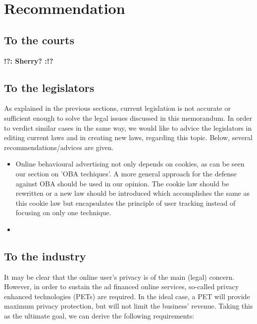 \documentclass[11pt]{article}
\newcommand{\tocheck}[1]{{\bf !?: #1 :!?}}
\begin{document}
\section{Recommendation}
\subsection{To the courts}
\tocheck{Sherry?}
\subsection{To the legislators}
As explained in the previous sections, current legislation is not accurate or sufficient enough to solve the legal issues discussed in this memorandum. In order to verdict similar cases in the same way, we would like to advice the legislators in editing current laws and in creating new laws, regarding this topic. Below, several recommendations/advices are given.


\begin{itemize}
	\item Online behavioural advertising not only depends on cookies, as can be seen our section on 'OBA techiques'. A more general approach for the defense against OBA should be used in our opinion. The cookie law \cite{cookie dinges cite wheet ik veel hoe die heet?} should be rewritten or a new law should be introduced which accomplishes the same as this cookie law but encapsulates the principle of user tracking instead of focusing on only one technique.
	\item 
\end{itemize}

\subsection{To the industry}
It may be clear that the online user's privacy is of the main (legal) concern. However, in order to sustain the ad financed online services, so-called privacy enhanced technologies (PETs) are required. In the ideal case, a PET will provide maximum privacy protection, but will not limit the business' revenue. Taking this as the ultimate goal, we can derive the following requirements:
\end{document}
